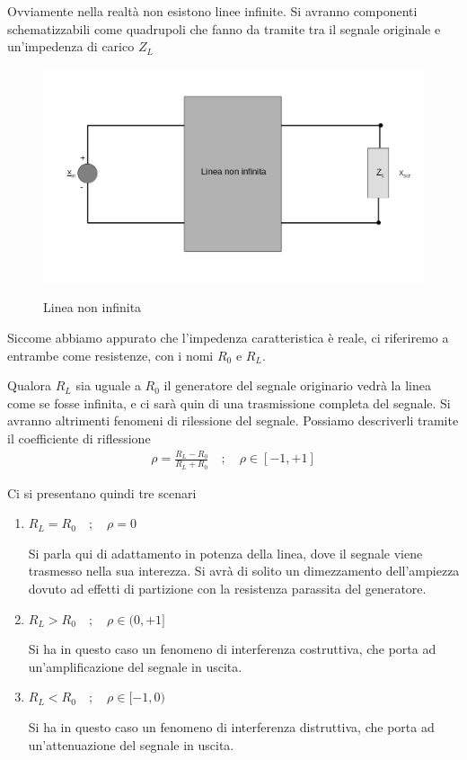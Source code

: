 \documentclass[a4paper,12pt]{report}
\newcommand{\spacer}{\quad ; \quad}
\begin{document}
Ovviamente nella realtà non esistono linee infinite. Si avranno componenti schematizzabili come quadrupoli che fanno da tramite tra il segnale originale e un'impedenza di carico $Z_L$
\begin{figure}[!htb]
	\centering
	\includegraphics[width=.4\textwidth]{pictures/linea7.png}
	\label{ergwg}
	\caption{\label{luegregegl} \small Linea non infinita}
\end{figure}

Siccome abbiamo appurato che l'impedenza caratteristica è reale, ci riferiremo a entrambe come resistenze, con i nomi $R_0$ e $R_L$.

Qualora $R_L$ sia uguale a $R_0$ il generatore del segnale originario vedrà la linea come se fosse infinita, e ci sarà quin di una trasmissione completa del segnale. Si avranno altrimenti fenomeni di rilessione del segnale. Possiamo descriverli tramite il coefficiente di riflessione
\begin{align}
\rho = \frac{R_L - R_0}{R_L + R_0} \spacer \rho \in [-1 ,+1]
\end{align} 

Ci si presentano quindi tre scenari
\begin{enumerate}
	\item $R_L =R_0 \spacer \rho = 0$
	
	Si parla qui di adattamento in potenza della linea, dove il segnale viene trasmesso nella sua interezza. Si avrà di solito un dimezzamento dell'ampiezza dovuto ad effetti di partizione con la resistenza parassita del generatore.
	
	\item $R_L > R_0 \spacer \rho \in (0,+1]$
	
	Si ha in questo caso un fenomeno di interferenza costruttiva, che porta ad un'amplificazione del segnale in uscita.
	
	\item $R_L < R_0 \spacer \rho \in [-1,0)$

	Si ha in questo caso un fenomeno di interferenza distruttiva, che porta ad un'attenuazione del segnale in uscita.	
\end{enumerate}

\newpage
\end{document}
